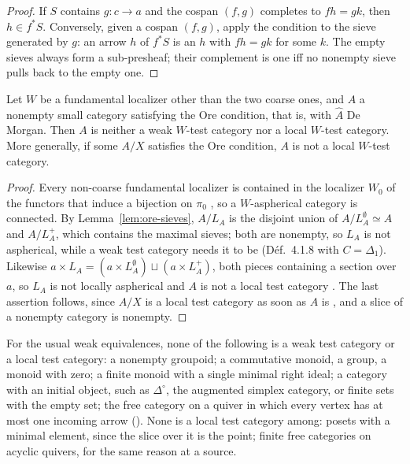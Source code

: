 \begin{proof}
If $S$ contains $g\colon c\to a$ and the cospan $(f,g)$ completes to $f h = g k$, then $h\in f^*S$. Conversely, given a cospan $(f,g)$, apply the condition to the sieve generated by $g$: an arrow $h$ of $f^*S$ is an $h$ with $fh = gk$ for some $k$. The empty sieves always form a sub-presheaf; their complement is one iff no nonempty sieve pulls back to the empty one.
\end{proof}

\begin{theorem}\label{th:ore}
Let $W$ be a fundamental localizer other than the two coarse ones, and $A$ a nonempty small category satisfying the Ore condition, that is, with $\widehat A$ De Morgan. Then $A$ is neither a weak $W$-test category nor a local $W$-test category. More generally, if some $A/X$ satisfies the Ore condition, $A$ is not a local $W$-test category.
\end{theorem}

\begin{proof}
Every non-coarse fundamental localizer is contained in the localizer $W_0$ of the functors that induce a bijection on $\pi_0$ \cite[Prop.~9.3.2]{cisinski-308}, so a $W$-aspherical category is connected. By Lemma~\ref{lem:ore-sieves}, $A/L_A$ is the disjoint union of $A/L_A^{\emptyset}\simeq A$ and $A/L_A^{+}$, which contains the maximal sieves; both are nonempty, so $L_A$ is not aspherical, while a weak test category needs it to be (Déf.~4.1.8 with $C=\Delta_1$). Likewise $a\times L_A = (a\times L_A^{\emptyset})\sqcup(a\times L_A^{+})$, both pieces containing a section over $a$, so $L_A$ is not locally aspherical and $A$ is not a local test category \cite[Th.~4.1.19]{cisinski-308}. The last assertion follows, since $A/X$ is a local test category as soon as $A$ is \cite[Prop.~4.1.14 (v)]{cisinski-308}, and a slice of a nonempty category is nonempty.
\end{proof}

\begin{corollary}\label{cor:ore}
For the usual weak equivalences, none of the following is a weak test category or a local test category: a nonempty groupoid; a commutative monoid, a group, a monoid with zero; a finite monoid with a single minimal right ideal; a category with an initial object, such as $\Delta^{\circ}$, the augmented simplex category, or finite sets with the empty set; the free category on a quiver in which every vertex has at most one incoming arrow (). None is a local test category among: posets with a minimal element, since the slice over it is the point; finite free categories on acyclic quivers, for the same reason at a source.
\end{corollary}

